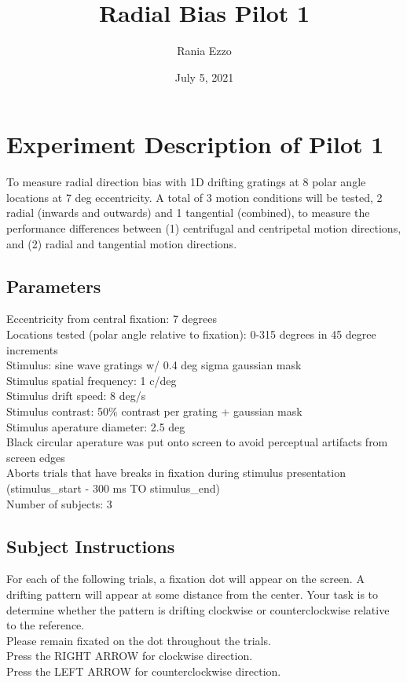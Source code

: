 \documentclass[11pt]{article} %
\title{Radial Bias Pilot 1}
\date{July 5, 2021}
\author{Rania Ezzo}
\begin{document}
\maketitle
\tableofcontents


\section{Experiment Description of Pilot 1}
To measure radial direction bias with 1D drifting gratings at 8 polar angle locations at 7 deg eccentricity. A total of 3 motion conditions will be tested, 2 radial (inwards and outwards) and 1 tangential (combined), to measure the performance differences between (1) centrifugal and centripetal motion directions, and (2) radial and tangential motion directions. 

\subsection{Parameters}
Eccentricity from central fixation: 7 degrees
\\
Locations tested (polar angle relative to fixation): 0-315 degrees in 45 degree increments
\\
Stimulus: sine wave gratings w/ 0.4 deg sigma gaussian mask
\\
Stimulus spatial frequency: 1 c/deg
\\
Stimulus drift speed: 8 deg/s
\\
Stimulus contrast: 50\% contrast per grating + gaussian mask
\\
Stimulus aperature diameter: 2.5 deg
\\
Black circular aperature was put onto screen to avoid perceptual artifacts from screen edges
\\
Aborts trials that have breaks in fixation during stimulus presentation (stimulus\_start - 300 ms TO stimulus\_end)
\\
Number of subjects: 3

\subsection{Subject Instructions}
For each of the following trials, a fixation dot will appear on the screen. A drifting pattern will appear at some distance from the center. Your task is to determine whether the pattern is drifting clockwise or counterclockwise relative to the reference.
\\
Please remain fixated on the dot throughout the trials.
\\
Press the RIGHT ARROW for clockwise direction.
\\
Press the LEFT ARROW for counterclockwise direction.
\end{document}

